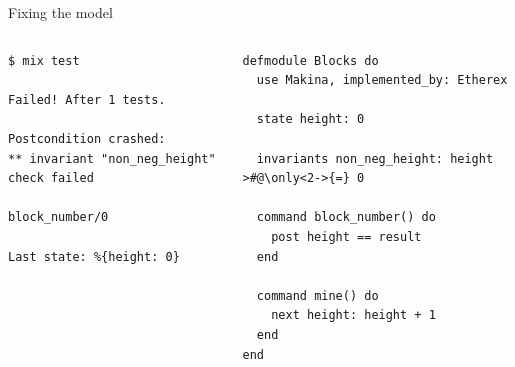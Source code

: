 \documentclass[aspectratio=169, 10pt, handout]{beamer}
\begin{document}
\begin{frame}[label={sec:org090ab58},fragile]{Fixing the model}
 \begin{columns}
\begin{column}{0.48\columnwidth}
\onslide<+->
\lstset{language=bash,label= ,caption= ,captionpos=b,numbers=none,style=shell}
\begin{lstlisting}
$ mix test

Failed! After 1 tests.

Postcondition crashed:
** invariant "non_neg_height" check failed

block_number/0

Last state: %{height: 0}
\end{lstlisting}
\end{column}

\begin{column}{0.48\columnwidth}
\lstset{language=elixir,label= ,caption= ,captionpos=b,numbers=none,style=display}
\begin{lstlisting}
defmodule Blocks do
  use Makina, implemented_by: Etherex

  state height: 0

  invariants non_neg_height: height >#@\only<2->{=} 0

  command block_number() do
    post height == result
  end

  command mine() do
    next height: height + 1
  end
end
\end{lstlisting}
\end{column}
\end{columns}
\end{frame}
\end{document}

